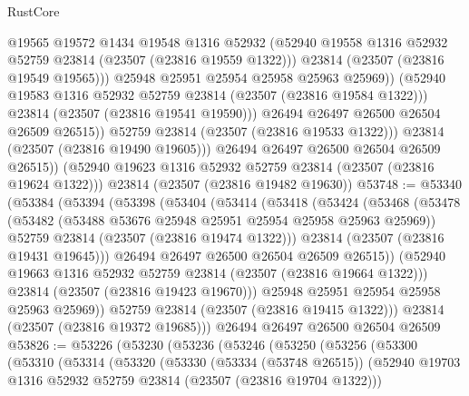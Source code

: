 \begin{lexlean}{RustCore}
\begin{coremodule}
                        @19565
                        @19572
                        @1434
                        @19548
                        @1316
                        @52932
                        (@52940 @19558 @1316 @52932 @52759 @23814 (@23507 (@23816 @19559 @1322)))
                        @23814
                        (@23507 (@23816 @19549 @19565)))
                      @25948
                      @25951
                      @25954
                      @25958
                      @25963
                      @25969))
                  (@52940 @19583 @1316 @52932 @52759 @23814 (@23507 (@23816 @19584 @1322)))
                  @23814
                  (@23507 (@23816 @19541 @19590)))
                @26494
                @26497
                @26500
                @26504
                @26509
                @26515))
            @52759
            @23814
            (@23507 (@23816 @19533 @1322)))
          @23814
          (@23507 (@23816 @19490 @19605)))
        @26494
        @26497
        @26500
        @26504
        @26509
        @26515))
    (@52940 @19623 @1316 @52932 @52759 @23814 (@23507 (@23816 @19624 @1322)))
    @23814
    (@23507 (@23816 @19482 @19630))
@53748 := @53340
    (@53384
      (@53394
        (@53398
          (@53404
            (@53414
              (@53418
                (@53424
                  (@53468
                    (@53478
                      (@53482 (@53488 @53676 @25948 @25951 @25954 @25958 @25963 @25969))
                      @52759
                      @23814
                      (@23507 (@23816 @19474 @1322)))
                    @23814
                    (@23507 (@23816 @19431 @19645)))
                  @26494
                  @26497
                  @26500
                  @26504
                  @26509
                  @26515))
              (@52940 @19663 @1316 @52932 @52759 @23814 (@23507 (@23816 @19664 @1322)))
              @23814
              (@23507 (@23816 @19423 @19670)))
            @25948
            @25951
            @25954
            @25958
            @25963
            @25969))
        @52759
        @23814
        (@23507 (@23816 @19415 @1322)))
      @23814
      (@23507 (@23816 @19372 @19685)))
    @26494
    @26497
    @26500
    @26504
    @26509
@53826 := @53226
    (@53230
      (@53236
        (@53246
          (@53250
            (@53256
              (@53300
                (@53310
                  (@53314
                    (@53320
                      (@53330
                        (@53334 (@53748 @26515))
                        (@52940 @19703 @1316 @52932 @52759 @23814 (@23507 (@23816 @19704 @1322)))

\end{coremodule}
\end{lexlean}

